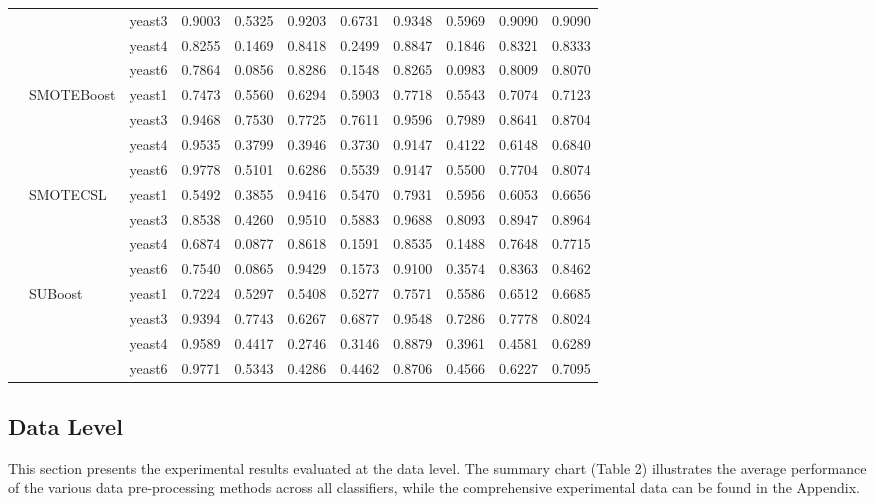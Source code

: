 \documentclass[sigconf]{acmart}
\begin{document}
\begin{table}[htbp]
\begin{tabular}{llccccccccc}
    & & yeast3 & 0.9003 & 0.5325 & 0.9203 & 0.6731 & 0.9348 & 0.5969 & 0.9090 & 0.9090 \\
    & & yeast4 & 0.8255 & 0.1469 & 0.8418 & 0.2499 & 0.8847 & 0.1846 & 0.8321 & 0.8333 \\
    & & yeast6 & 0.7864 & 0.0856 & 0.8286 & 0.1548 & 0.8265 & 0.0983 & 0.8009 & 0.8070 \\
    \cmidrule{2-11}
    & \multirow{4}{*}{SMOTEBoost}
      & yeast1 & 0.7473 & 0.5560 & 0.6294 & 0.5903 & 0.7718 & 0.5543 & 0.7074 & 0.7123 \\
    & & yeast3 & 0.9468 & 0.7530 & 0.7725 & 0.7611 & 0.9596 & 0.7989 & 0.8641 & 0.8704 \\
    & & yeast4 & 0.9535 & 0.3799 & 0.3946 & 0.3730 & 0.9147 & 0.4122 & 0.6148 & 0.6840 \\
    & & yeast6 & 0.9778 & 0.5101 & 0.6286 & 0.5539 & 0.9147 & 0.5500 & 0.7704 & 0.8074 \\
    \cmidrule{2-11}
    & \multirow{4}{*}{SMOTECSL}
      & yeast1 & 0.5492 & 0.3855 & 0.9416 & 0.5470 & 0.7931 & 0.5956 & 0.6053 & 0.6656 \\
    & & yeast3 & 0.8538 & 0.4260 & 0.9510 & 0.5883 & 0.9688 & 0.8093 & 0.8947 & 0.8964 \\
    & & yeast4 & 0.6874 & 0.0877 & 0.8618 & 0.1591 & 0.8535 & 0.1488 & 0.7648 & 0.7715 \\
    & & yeast6 & 0.7540 & 0.0865 & 0.9429 & 0.1573 & 0.9100 & 0.3574 & 0.8363 & 0.8462 \\
    \cmidrule{2-11}
    & \multirow{4}{*}{SUBoost}
      & yeast1 & 0.7224 & 0.5297 & 0.5408 & 0.5277 & 0.7571 & 0.5586 & 0.6512 & 0.6685 \\
    & & yeast3 & 0.9394 & 0.7743 & 0.6267 & 0.6877 & 0.9548 & 0.7286 & 0.7778 & 0.8024 \\
    & & yeast4 & 0.9589 & 0.4417 & 0.2746 & 0.3146 & 0.8879 & 0.3961 & 0.4581 & 0.6289 \\
    & & yeast6 & 0.9771 & 0.5343 & 0.4286 & 0.4462 & 0.8706 & 0.4566 & 0.6227 & 0.7095 \\
    \bottomrule
  \end{tabular}
\end{table}
\clearpage

\subsection{Data Level}

This section presents the experimental results evaluated at the data level. The summary chart (Table 2) illustrates the average performance of the various data pre-processing methods across all classifiers, while the comprehensive experimental data can be found in the Appendix. 
\end{document}
